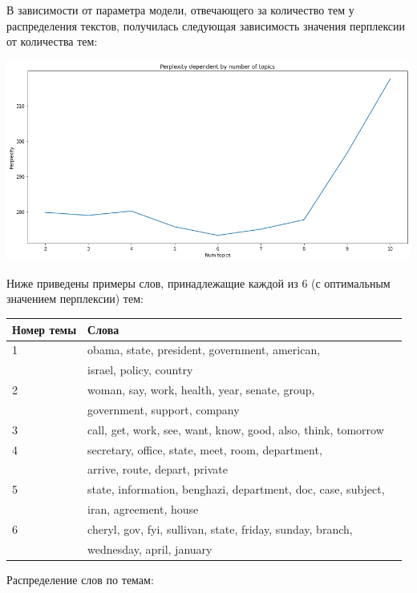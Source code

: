В зависимости от параметра модели, отвечающего за количество тем у распределения текстов, получилась следующая зависимость значения перплексии от количества тем:

\includegraphics[scale=0.5]{pics/perplexity.png}

Ниже приведены примеры слов, принадлежащие каждой из 6 (с оптимальным значением перплексии) тем:

\begin{tabular}{ | l | l | l | }
\hline
Номер темы & Слова \\ \hline
1 & obama, state, president, government, american, \\ & israel,  policy, country \\ \hline
2 & woman, say, work, health, year, senate, group, \\ & government,  support, company \\ \hline
3 & call, get, work, see, want, know, good, also, think, tomorrow \\ \hline
4 & secretary, office, state, meet, room, department,  \\ &  arrive, route, depart, private \\ \hline 
5 & state, information, benghazi, department, doc, case, subject, \\ & iran, agreement, house \\ \hline
6 & cheryl, gov, fyi, sullivan, state, friday, sunday, branch,  \\ & wednesday, april, january \\ \hline 

\end{tabular}

\newpage

Распределение слов по темам:

